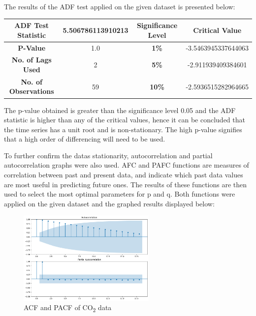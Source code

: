 \documentclass[12pt]{mcmthesis}
\begin{document}
    The results of the ADF test applied on the given dataset is presented below:
%
    \begin{center}
        \begin{tabular}{ |c|c|c|c|}
            \hline
            \textbf{ADF Test Statistic}  & 5.506786113910213 & \textbf{Significance Level} & \textbf{Critical Value} \\
            \hline
            \textbf{P-Value}             & 1.0               & \textbf{1\%}                & -3.5463945337644063     \\
            \hline
            \textbf{No. of Lags Used}    & 2                 & \textbf{5\%}                & -2.911939409384601      \\
            \hline
            \textbf{No. of Observations} & 59                & \textbf{10\%}               & -2.5936515282964665     \\
            \hline
        \end{tabular}
    \end{center}

    The p-value obtained is greater than the significance level 0.05 and the ADF statistic is higher than any of the critical values, hence it can be concluded that the time series has a unit root and is non-stationary. The high p-value signifies that a high order of differencing will need to be used.

    To further confirm the data\textquotesingle s stationarity, autocorrelation and partial autocorrelation graphs were also used. AFC and PAFC functions are measures of correlation between past and present data, and indicate which past data values are most useful in predicting future ones. The results of these functions are then used to select the most optimal parameters for p and q. Both functions were applied on the given dataset and the graphed results displayed below:

    \begin{figure}
        \centering
        \includegraphics[width=0.6\textwidth]{pacf_acf}
        \caption{ACF and PACF of CO\textsubscript{2} data}
        \label{fig:pacf_acf}
    \end{figure}
\end{document}
